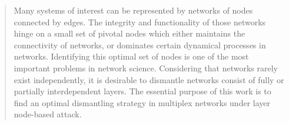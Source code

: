 \documentclass[%
 aip,
 cha,
 amsmath,amssymb,
 reprint,%
]{revtex4-1}
\begin{document}
\maketitle

\begin{quotation}
Many systems of interest can be represented by networks of nodes connected by edges. The integrity and functionality of those networks hinge on a small set of pivotal nodes which either maintains the connectivity of networks, or dominates certain dynamical processes in networks. Identifying this optimal set of nodes is one of the most important problems in network science. Considering that networks rarely exist independently, it is desirable to dismantle networks consist of fully or partially interdependent layers. The essential purpose of this work is to find an optimal dismantling strategy in multiplex networks under layer node-based attack.





\end{quotation}
\end{document}
